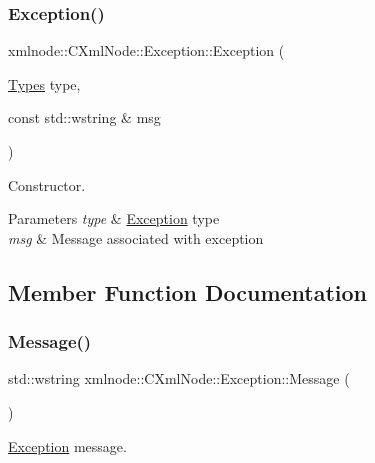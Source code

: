 \subsubsection{\texorpdfstring{Exception()}{Exception()}\hspace{0.1cm}{\footnotesize\ttfamily [2/2]}}
{\footnotesize\ttfamily xmlnode\+::\+C\+Xml\+Node\+::\+Exception\+::\+Exception (\begin{DoxyParamCaption}\item[{\mbox{\hyperlink{classxmlnode_1_1_c_xml_node_1_1_exception_abdbe07531ef4b19192f1fa2f819ed75f}{Types}}}]{type,  }\item[{const std\+::wstring \&}]{msg }\end{DoxyParamCaption})\hspace{0.3cm}{\ttfamily [inline]}}



Constructor. 


\begin{DoxyParams}{Parameters}
{\em type} & \mbox{\hyperlink{classxmlnode_1_1_c_xml_node_1_1_exception}{Exception}} type \\
\hline
{\em msg} & Message associated with exception \\
\hline
\end{DoxyParams}


\subsection{Member Function Documentation}
\mbox{\label{classxmlnode_1_1_c_xml_node_1_1_exception_a29271ad0ec50958663200f60aaae97b2}} 
\subsubsection{\texorpdfstring{Message()}{Message()}}
{\footnotesize\ttfamily std\+::wstring xmlnode\+::\+C\+Xml\+Node\+::\+Exception\+::\+Message (\begin{DoxyParamCaption}{ }\end{DoxyParamCaption})\hspace{0.3cm}{\ttfamily [inline]}}



\mbox{\hyperlink{classxmlnode_1_1_c_xml_node_1_1_exception}{Exception}} message. 

